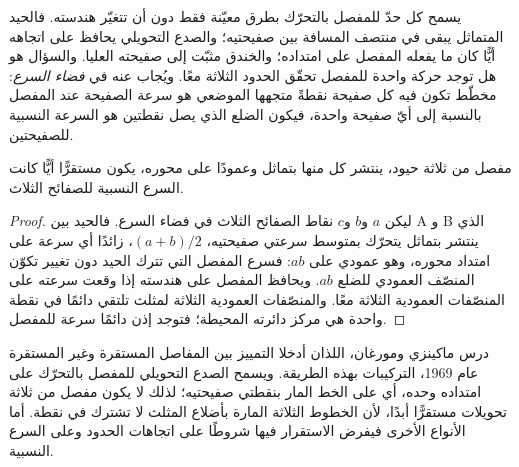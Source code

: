 يسمح كل حدّ للمفصل بالتحرّك بطرق معيّنة فقط دون أن تتغيّر هندسته. فالحيد المتماثل يبقى في منتصف المسافة بين صفيحتيه؛ والصدع التحويلي يحافظ على اتجاهه أيًّا كان ما يفعله المفصل على امتداده؛ والخندق مثبّت إلى صفيحته العليا. والسؤال هو هل توجد حركة واحدة للمفصل تحقّق الحدود الثلاثة معًا. ويُجاب عنه في \emph{فضاء السرع}: مخطّط تكون فيه كل صفيحة نقطةً متجهها الموضعي هو سرعة الصفيحة عند المفصل بالنسبة إلى أيّ صفيحة واحدة، فيكون الضلع الذي يصل نقطتين هو السرعة النسبية للصفيحتين.

\begin{proposition}\label{prop:b1:plate-kinematics:rrr}
مفصل من ثلاثة حيود، ينتشر كل منها بتماثل وعمودًا على محوره، يكون مستقرًّا أيًّا كانت السرع النسبية للصفائح الثلاث.
\end{proposition}

\begin{proof}
ليكن $a$ و$b$ و$c$ نقاط الصفائح الثلاث في فضاء السرع. فالحيد بين A و B الذي ينتشر بتماثل يتحرّك بمتوسط سرعتي صفيحتيه، $(a + b)/2$، زائدًا أي سرعة على امتداد محوره، وهو عمودي على $ab$: فسرع المفصل التي تترك الحيد دون تغيير تكوّن المنصّف العمودي للضلع $ab$. ويحافظ المفصل على هندسته إذا وقعت سرعته على المنصّفات العمودية الثلاثة معًا. والمنصّفات العمودية الثلاثة لمثلث تلتقي دائمًا في نقطة واحدة هي مركز دائرته المحيطة؛ فتوجد إذن دائمًا سرعة للمفصل.
\end{proof}

درس ماكينزي ومورغان، اللذان أدخلا التمييز بين المفاصل المستقرة وغير المستقرة عام 1969، التركيبات بهذه الطريقة. ويسمح الصدع التحويلي للمفصل بالتحرّك على امتداده وحده، أي على الخط المار بنقطتي صفيحتيه؛ لذلك لا يكون مفصل من ثلاثة تحويلات مستقرًّا أبدًا، لأن الخطوط الثلاثة المارة بأضلاع المثلث لا تشترك في نقطة. أما الأنواع الأخرى فيفرض الاستقرار فيها شروطًا على اتجاهات الحدود وعلى السرع النسبية.

